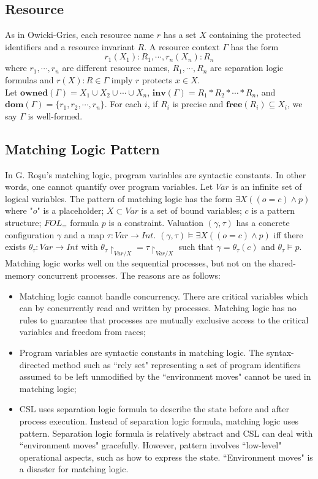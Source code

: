 \documentclass{lmcs} %
\theoremstyle{plain}\newtheorem{satz}[thm]{Satz} %
\begin{document}
\subsection*{Resource}
As in Owicki-Gries\cite{owicki1976verifying}, each resource name $r$ has a set $X$ containing the protected identifiers and a resource invariant $R$\cite{hoare1972towards}. A resource context $\Gamma$ has the form
$$r_1(X_1):R_1,\cdots,r_n(X_n):R_n$$
where $r_1,\cdots,r_n$ are different resource names, $R_1,\cdots,R_n$ are separation logic formulas and $r(X):R \in \Gamma$ imply $r$ protects $x\in X$. \\
Let $\mathbf{owned}(\Gamma)=X_1 \cup X_2 \cup \cdots \cup X_n$, $\mathbf{inv}(\Gamma)=R_1*R_2*\cdots*R_n$, and $\mathbf{dom}(\Gamma)=\{r_1,r_2,\cdots,r_n\}$.
For each $i$, if $R_i$ is precise and $\mathbf{free}(R_i)\subseteq X_i$, we say $\Gamma$ is well-formed.
\subsection*{Matching Logic Pattern}
In G. Ro\c{s}u's matching logic, program variables are syntactic constants. In other words, one cannot quantify over program variables. Let $\mathit{Var}$ is an infinite set of logical variables. The pattern of matching logic has the form
$\exists X((o=c)\land p)$
where "$\mathit{o}$" is a placeholder; $X \subset \mathit{Var}$ is a set of bound variables; $c$ is a pattern structure; $\mathit{FOL}_=$ formula $p$ is a constraint. Valuation $(\gamma,\tau)$ has a concrete configuration $\gamma$ and a map $\tau:\mathit{Var}\to Int$.
$(\gamma,\tau)\models \exists X((o=c)\land p)$ iff there exists $\theta_\tau:\mathit{Var}\to Int$ with $\theta_\tau\!\!\upharpoonright_{\mathit{Var}/X}=\tau\!\!\upharpoonright_{\mathit{Var}/X}$ such that $\gamma=\theta_\tau(c)$ and $\theta_\tau \models p$.\\
Matching logic works well on the sequential processes\cite{chen2019matching}\cite{chen2021matching}\cite{rocsu2012hoare}\cite{rosu2011matching}, but not on the shared-memory concurrent processes. The reasons are as follows:
\begin{itemize}
  \item Matching logic cannot handle concurrency. There are critical variables which can by concurrently read and written by processes. Matching logic has no rules to guarantee that processes are mutually exclusive access to the critical variables and freedom from races;
  \item Program variables are syntactic constants in matching logic. The syntax-directed method such as ``rely set" representing a set of program identifiers assumed to be left unmodified by the ``environment moves" cannot be used in matching logic;
  \item CSL uses separation logic formula to describe the state before and after process execution. Instead of separation logic formula, matching logic uses pattern. Separation logic formula is relatively abstract and CSL can deal with ``environment moves" gracefully. However, pattern involves ``low-level" operational aspects, such as how to express the state. ``Environment moves" is a disaster for matching logic.
\end{itemize}
\end{document}
